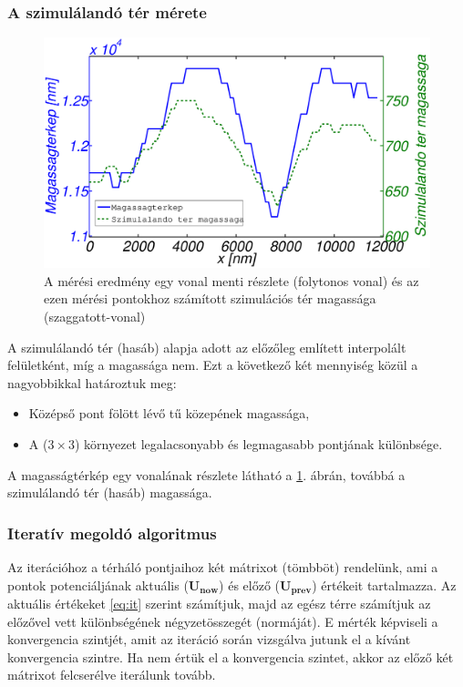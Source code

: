 \subsubsection{A szimulálandó tér mérete}
	\begin{figure}[!ht]
		\centering
		\includegraphics[width=0.7\columnwidth]{kepek/eps/numh_vonal.eps}%
		\caption{\scriptsize A mérési eredmény egy vonal menti részlete (folytonos vonal) és az ezen
		mérési pontokhoz számított szimulációs tér magassága (szaggatott-vonal)}
		\label{fig:numh} 
	\end{figure}
	
	A szimulálandó tér (hasáb) alapja adott az előzőleg említett interpolált felületként, míg a
	magassága nem. Ezt a következő két mennyiség közül a nagyobbikkal határoztuk meg:
	\begin{itemize}
		\item Középső pont fölött lévő tű közepének magassága,
		\item A ($3\times3$) környezet legalacsonyabb és legmagasabb pontjának
		különbsége.
	\end{itemize}
	A magasságtérkép egy vonalának részlete látható a \ref{fig:numh}. ábrán, 
	továbbá a szimulálandó tér (hasáb) magassága.
	
	\subsubsection{Iteratív megoldó algoritmus}
	Az iterációhoz a térháló pontjaihoz két mátrixot (tömbböt) rendelünk, ami a
	pontok potenciáljának aktuális ($\mathbf{U_{now}}$) és előző ($\mathbf{U_{prev}}$)
	értékeit tartalmazza.
	Az aktuális értékeket \eqref{eq:it} szerint számítjuk, majd az egész térre
	számítjuk az előzővel vett különbségének négyzetösszegét (normáját). E mérték
	képviseli a konvergencia szintjét, amit az iteráció során vizsgálva jutunk el a
	kívánt konvergencia szintre.
	Ha nem értük el a konvergencia szintet, akkor az előző két mátrixot
	felcserélve iterálunk tovább.
	

